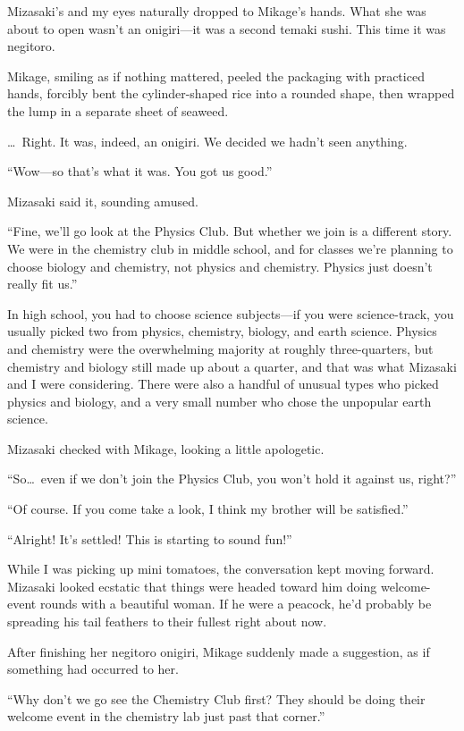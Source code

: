 \documentclass[
    a4paper,
    12pt,
    twoside,
    openany,
    UTF8,
    fontset=windows
]{ctexbook}
\begin{document}
Mizasaki's and my eyes naturally dropped to Mikage's hands. What she was about to open wasn't an onigiri---it was a second temaki sushi. This time it was negitoro.

Mikage, smiling as if nothing mattered, peeled the packaging with practiced hands, forcibly bent the cylinder-shaped rice into a rounded shape, then wrapped the lump in a separate sheet of seaweed.

\dots\ Right. It was, indeed, an onigiri. We decided we hadn't seen anything.

``Wow---so that's what it was. You got us good.''

Mizasaki said it, sounding amused.

``Fine, we'll go look at the Physics Club. But whether we join is a different story. We were in the chemistry club in middle school, and for classes we're planning to choose biology and chemistry, not physics and chemistry. Physics just doesn't really fit us.''

In high school, you had to choose science subjects---if you were science-track, you usually picked two from physics, chemistry, biology, and earth science. Physics and chemistry were the overwhelming majority at roughly three-quarters, but chemistry and biology still made up about a quarter, and that was what Mizasaki and I were considering. There were also a handful of unusual types who picked physics and biology, and a very small number who chose the unpopular earth science.

Mizasaki checked with Mikage, looking a little apologetic.

``So\dots\ even if we don't join the Physics Club, you won't hold it against us, right?''

``Of course. If you come take a look, I think my brother will be satisfied.''

``Alright! It's settled! This is starting to sound fun!''

While I was picking up mini tomatoes, the conversation kept moving forward. Mizasaki looked ecstatic that things were headed toward him doing welcome-event rounds with a beautiful woman. If he were a peacock, he'd probably be spreading his tail feathers to their fullest right about now.

After finishing her negitoro onigiri, Mikage suddenly made a suggestion, as if something had occurred to her.

``Why don't we go see the Chemistry Club first? They should be doing their welcome event in the chemistry lab just past that corner.''
\end{document}
